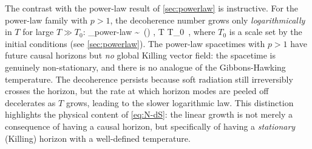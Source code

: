 The contrast with the power-law result of \cref{sec:powerlaw} is instructive.
For the power-law family with $p > 1$, the decoherence number grows only
\emph{logarithmically} in $T$ for large $T \gg T_0$:
%
\be
  \Nnum_{\rm power-law}
  \;\sim\;
  \,\ln\!\lb(\rb) ,
  \qquad T \gg T_0 \,,
  \label{eq:N-PL-repeat}
\ee
%
where $T_0$ is a scale set by the initial conditions (see \cref{sec:powerlaw}).
The power-law spacetimes with $p > 1$ have future causal horizons but
\emph{no} global Killing vector field: the spacetime is genuinely
non-stationary, and there is no analogue of the Gibbons-Hawking temperature.
The decoherence persists because soft radiation still irreversibly crosses the
horizon, but the rate at which horizon modes are peeled off decelerates as $T$
grows, leading to the slower logarithmic law.  This distinction highlights the
physical content of \cref{eq:N-dS}: the linear growth is not merely a
consequence of having a causal horizon, but specifically of having a
\emph{stationary} (Killing) horizon with a well-defined temperature.

